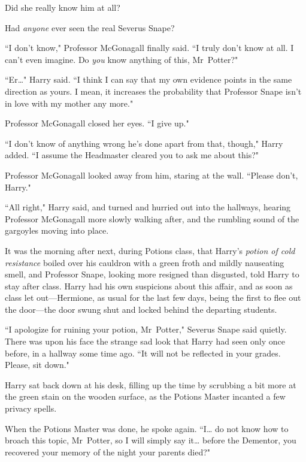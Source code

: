Did she really know him at all?

Had \emph{anyone} ever seen the real Severus Snape?

\later

``I don't know," Professor McGonagall finally said. ``I truly don't know at all. I can't even imagine. Do \emph{you} know anything of this, Mr~Potter?"

``Er{\ldots}" Harry said. ``I think I can say that my own evidence points in the same direction as yours. I mean, it increases the probability that Professor Snape isn't in love with my mother any more."

Professor McGonagall closed her eyes. ``I give up."

``I don't know of anything wrong he's done apart from that, though," Harry added. ``I assume the Headmaster cleared you to ask me about this?"

Professor McGonagall looked away from him, staring at the wall. ``Please don't, Harry."

``All right," Harry said, and turned and hurried out into the hallways, hearing Professor McGonagall more slowly walking after, and the rumbling sound of the gargoyles moving into place.

\later

It was the morning after next, during Potions class, that Harry's \emph{potion of cold resistance} boiled over his cauldron with a green froth and mildly nauseating smell, and Professor Snape, looking more resigned than disgusted, told Harry to stay after class. Harry had his own suspicions about this affair, and as soon as class let out—Hermione, as usual for the last few days, being the first to flee out the door—the door swung shut and locked behind the departing students.

``I apologize for ruining your potion, Mr~Potter," Severus Snape said quietly. There was upon his face the strange sad look that Harry had seen only once before, in a hallway some time ago. ``It will not be reflected in your grades. Please, sit down."

Harry sat back down at his desk, filling up the time by scrubbing a bit more at the green stain on the wooden surface, as the Potions Master incanted a few privacy spells.

When the Potions Master was done, he spoke again. ``I{\ldots} do not know how to broach this topic, Mr~Potter, so I will simply say it{\ldots} before the Dementor, you recovered your memory of the night your parents died?"

